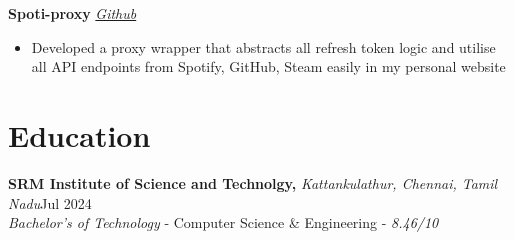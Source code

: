\documentclass[11pt]{article}       %
\begin{document}
\textbf{Spoti-proxy} \hfill \href{https://github.com/apparentlyarhm/spotify-proxy}{\textit{Github}} \\
\vspace{-9pt}
\begin{itemize}
    \item {Developed a proxy wrapper that abstracts all refresh token logic and utilise all API endpoints from Spotify, GitHub, Steam easily in my personal website}
\end{itemize}


\vspace{-18.5pt}

\section*{Education}
\textbf{SRM Institute of Science and Technolgy,} \textit{Kattankulathur, Chennai, Tamil Nadu}\hfill Jul 2024 \\
\textit{Bachelor's of Technology} - Computer Science {\&} Engineering - \textit{8.46/10}
\end{document}
